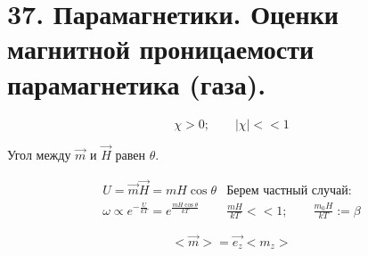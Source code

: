 \section*{37. Парамагнетики. Оценки магнитной проницаемости парамагнетика (газа).}

\[
\chi>0; \qquad |\chi|<<1
\]

Угол между \( \vec{m} \) и \( \vec{H} \) равен \( \theta \).

\[
\begin{array}{l|l}
    U=\vec{m}\vec{H}=mH\cos\theta & \text{Берем частный случай:} \\
    \omega \propto e^{-\frac{U}{kT}}=e^{\frac{mH\cos\theta}{kT} } & \frac{mH}{kT}<<1 ; \qquad \frac{m_0H}{kT}:=\beta  
\end{array}
\]

\[
<\vec{m}>=\vec{e_z}<m_z>
\]